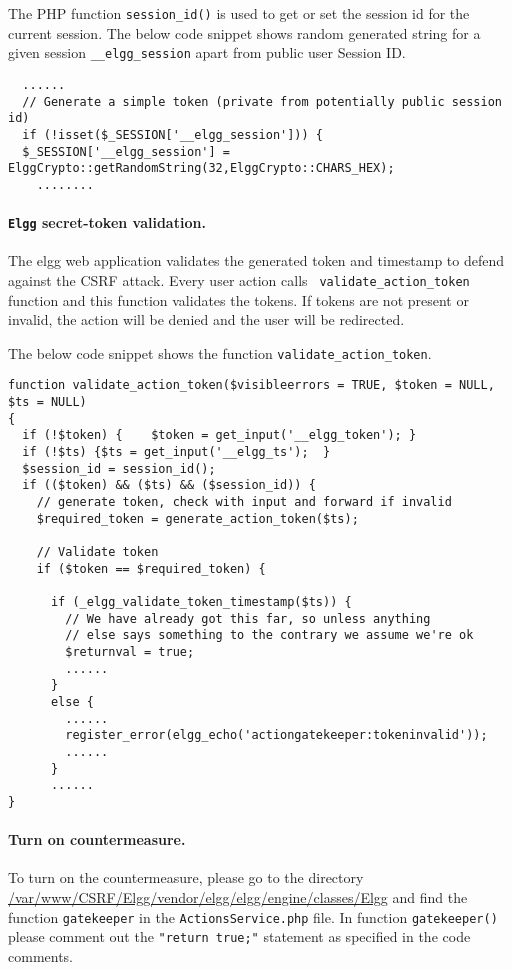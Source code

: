 The PHP function {\tt session\_id()} is used to get or set the session id
for the current session.  The below code snippet shows random generated
string for a given session {\tt\_\_elgg\_session} apart from public user
Session ID.

\begin{lstlisting}
  ...... 
  // Generate a simple token (private from potentially public session id)
  if (!isset($_SESSION['__elgg_session'])) {
  $_SESSION['__elgg_session'] = ElggCrypto::getRandomString(32,ElggCrypto::CHARS_HEX);
	........
\end{lstlisting}

\paragraph{{\tt Elgg} secret-token validation.}
The elgg web application validates the generated token and timestamp to
defend against the CSRF attack.  Every user action calls {\tt
validate\_action\_token} function and this function validates the tokens.
If tokens are not present or invalid, the action will be denied and the
user will be redirected.
 
 
The below code snippet shows the function {\tt validate\_action\_token}.

\begin{lstlisting}
function validate_action_token($visibleerrors = TRUE, $token = NULL, $ts = NULL) 
{
  if (!$token) {	$token = get_input('__elgg_token');	}
  if (!$ts) {$ts = get_input('__elgg_ts');	}
  $session_id = session_id();
  if (($token) && ($ts) && ($session_id)) {
    // generate token, check with input and forward if invalid
    $required_token = generate_action_token($ts);

    // Validate token
    if ($token == $required_token) {
			
      if (_elgg_validate_token_timestamp($ts)) {
        // We have already got this far, so unless anything
        // else says something to the contrary we assume we're ok
        $returnval = true;
        ......
      }
      else {     
        ......
        register_error(elgg_echo('actiongatekeeper:tokeninvalid'));
        ......
      }
      ......
}
\end{lstlisting}



\paragraph{Turn on countermeasure.}
To turn on the countermeasure, please go to the directory
\url{/var/www/CSRF/Elgg/vendor/elgg/elgg/engine/classes/Elgg} and 
find the function {\tt gatekeeper} in the {\tt ActionsService.php} file. 
In function {\tt gatekeeper()} please comment out the 
{\tt "return true;"} statement as specified in the code comments.

